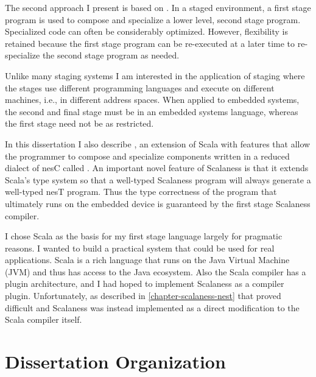 The second approach I present is based on 
\cite{Taha-MetaML,Sheard-TemplateHaskell,Mainland-Flask-2008,FramedML}. In a staged environment,
a first stage program is used to compose and specialize a lower level, second stage program.
Specialized code can often be considerably optimized. However, flexibility is retained because
the first stage program can be re-executed at a later time to re-specialize the second stage
program as needed.

Unlike many staging systems I am interested in the application of staging where the stages use
different programming languages and execute on different machines, i.e., in different address
spaces. When applied to embedded systems, the second and final stage must be in an embedded
systems language, whereas the first stage need not be as restricted.

In this dissertation I also describe  \cite{chapin-GPCE-2013}, an extension
of Scala \cite{PiS2} with features that allow the programmer to compose and specialize
components written in a reduced dialect of nesC called . An important novel
feature of Scalaness is that it extends Scala's type system so that a well-typed Scalaness
program will always generate a well-typed nesT program. Thus the type correctness of the program
that ultimately runs on the embedded device is guaranteed by the first stage Scalaness compiler.

I chose Scala as the basis for my first stage language largely for pragmatic reasons. I wanted
to build a practical system that could be used for real applications. Scala is a rich language
that runs on the Java Virtual Machine (JVM) and thus has access to the Java ecosystem. Also the
Scala compiler has a plugin architecture, and I had hoped to implement Scalaness as a compiler
plugin. Unfortunately, as described in \autoref{chapter-scalaness-nest} that proved difficult
and Scalaness was instead implemented as a direct modification to the Scala compiler itself.

\section{Dissertation Organization}

